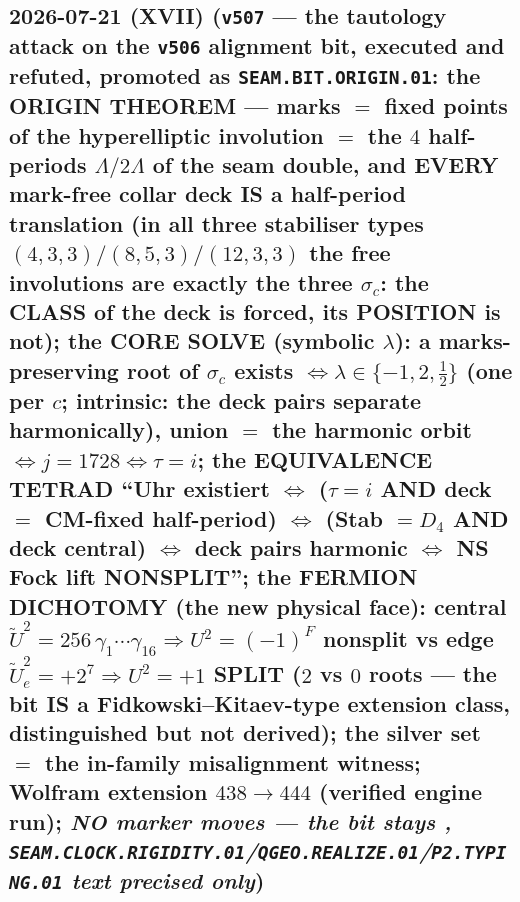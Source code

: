 \subsection*{2026-07-21 (XVII) (\texttt{v507} --- the tautology attack on the \texttt{v506} alignment bit, executed and refuted, promoted as \texttt{SEAM.BIT.ORIGIN.01}: the ORIGIN THEOREM --- marks $=$ fixed points of the hyperelliptic involution $=$ the $4$ half-periods $\Lambda/2\Lambda$ of the seam double, and EVERY mark-free collar deck IS a half-period translation (in all three stabiliser types $(4,3,3)/(8,5,3)/(12,3,3)$ the free involutions are exactly the three $\sigma_c$: the CLASS of the deck is forced, its POSITION is not); the CORE SOLVE (symbolic $\lambda$): a marks-preserving root of $\sigma_c$ exists $\iff\lambda\in\{-1,2,\tfrac12\}$ (one per $c$; intrinsic: the deck pairs separate harmonically), union $=$ the harmonic orbit $\iff j=1728\iff\tau=i$; the EQUIVALENCE TETRAD ``Uhr existiert $\iff$ ($\tau{=}i$ AND deck $=$ CM-fixed half-period) $\iff$ (Stab $=D_4$ AND deck central) $\iff$ deck pairs harmonic $\iff$ NS Fock lift NONSPLIT''; the FERMION DICHOTOMY (the new physical face): central $\tilde U^2=256\,\gamma_1\cdots\gamma_{16}\Rightarrow U^2=(-1)^F$ nonsplit vs edge $\tilde U_e^2=+2^7\Rightarrow U^2=+1$ SPLIT ($2$ vs $0$ roots --- the bit IS a Fidkowski--Kitaev-type extension class, distinguished but not derived); the silver set $=$ the in-family misalignment witness; Wolfram extension $438\to444$ (verified engine run); \emph{NO marker moves --- the bit stays \mC, \texttt{SEAM.CLOCK.RIGIDITY.01}/\texttt{QGEO.REALIZE.01}/\texttt{P2.TYPING.01} text precised only})}
